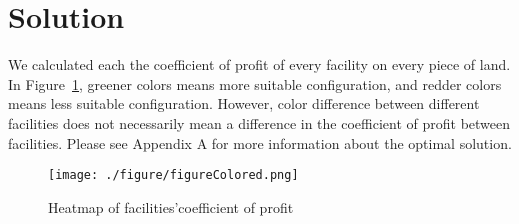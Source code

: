 \documentclass[./main.tex]{subfiles}
\begin{document}
    \section{Solution}
    We calculated each the coefficient of profit of every facility on every piece of land.
    In Figure~\ref{fig:figureHeapmap}, greener colors means more suitable configuration, and redder colors means less suitable configuration.
    However, color difference between different facilities does not necessarily mean a difference in the coefficient
    of profit between facilities.
    Please see Appendix A for more information about the optimal solution.

    \begin{figure}[H]
        \centering
        \texttt{[image: ./figure/figureColored.png]}
        \caption{Heatmap of facilities\rq coefficient of profit}
        \label{fig:figureHeapmap}
    \end{figure}
\end{document}
